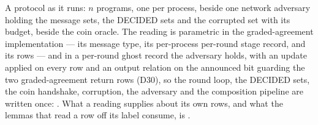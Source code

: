 \begin{definition}
  \label{def:aba-flat-reading}
  \leanok
  A protocol as it runs: $n$ programs, one per process, beside one network adversary holding the message sets, the DECIDED sets and the corrupted set with its budget, beside the coin oracle.
  The reading is parametric in the graded-agreement implementation --- its message type, its per-process per-round stage record, and its rows --- and in a per-round ghost record the adversary holds, with an update  applied on every row and an output relation on the announced bit guarding the two graded-agreement return rows (D30), so the round loop, the DECIDED sets, the coin handshake, corruption, the adversary and the composition pipeline are written once: .
  What a reading supplies about its own rows, and what the lemmas that read a row off its label consume, is .
\end{definition}
